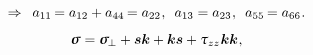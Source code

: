 \nopagebreak\vspace{-1em}
\begin{equation*}
\Rightarrow \hspace{.5em}
a_{11} \hspace{-.2ex} = a_{12} + a_{44} \hspace{-.2ex} = a_{22}
\hspace{.1ex} ,
\hspace{.5em}
a_{13} = a_{23}
\hspace{.1ex} ,
\hspace{.5em}
a_{55} \hspace{-.2ex} = a_{66}
\hspace{.1ex} .
\end{equation*}


\nopagebreak
\begin{equation}\label{stress tensor for a transversely isotropic material}
\linearstress
= \withtheindexofperpendicularity{\linearstress}
+ \bm{s} \bm{k}
+ \bm{k} \bm{s}
+ \cauchystresscomponents{zz} \hspace{.1ex} \bm{k} \bm{k}
\hspace{.1ex} ,
\end{equation}

\noindent
{}

